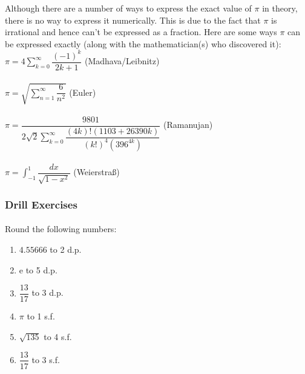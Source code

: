 \documentclass[12pt, a4paper, titlepage, twoside]{article}
\newcommand*{\e}{\textrm{e}}
\begin{document}
	\begin{fr}[Finding $\pi$]
		Although there are a number of ways to express the exact value of $\pi$ in theory, there is no way to express it numerically.
		This is due to the fact that $\pi$ is irrational and hence can't be expressed as a fraction. Here are some ways $\pi$ can
		be expressed exactly (along with the mathematician(s) who discovered it):\\
		
		\hfill $\displaystyle \pi = 4 \sum_{k=0}^{\infty} \dfrac{(-1)^k}{2k+1}$ \hfill (Madhava/Leibnitz)\\ \\
		
		\hfill $\displaystyle \pi = \sqrt{\sum_{n=1}^{\infty} \dfrac{6}{n^2}}$ \hfill (Euler)\\ \\
		
		\hfill $\displaystyle \pi = \dfrac{9801}{2\sqrt{2} \displaystyle\sum_{k=0}^{\infty} \dfrac{(4k)!(1103 + 26390k)}
		{(k!)^4 (396^{4k})}}$ \hfill (Ramanujan)\\ \\
		
		\hfill $\displaystyle \pi = \int_{-1}^1 \dfrac{dx}{\sqrt{1-x^2}}$ 
		\hfill(Weierstra{\ss}) 
	\end{fr}
	
	\subsubsection*{Drill Exercises}
	
	\paragraph{}
	 Round the following numbers:
	
	\begin{multicols}{2}
		\begin{enumerate}[label=\textbf{(\alph*)}]
			\item $4.55666$ to 2 d.p.
			\item $\e$ to 5 d.p.
			\item $\dfrac{13}{17}$ to 3 d.p.
			\item $\pi$ to 1 s.f.
			\item $\sqrt{135}$ to 4 s.f.
			\item $\dfrac{13}{17}$ to 3 s.f.
		\end{enumerate}
	\end{multicols}
	
\end{document}
